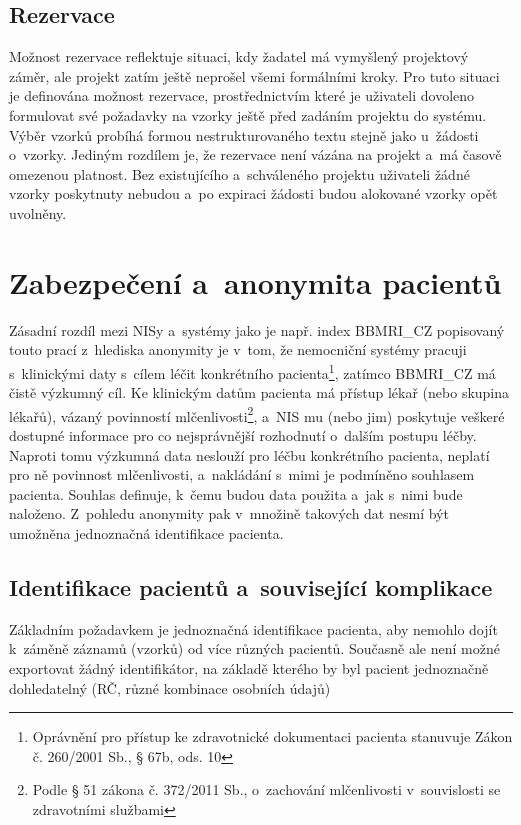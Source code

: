\documentclass[11pt, draft, oneside]{fithesis2}
\newcommand{\ProjectName}{\mbox{BBMRI\_CZ}\xspace}
\begin{document}
\subsection{Rezervace}
Možnost rezervace reflektuje situaci, kdy žadatel má vymyšlený projektový záměr, ale projekt zatím ještě neprošel všemi formálními kroky. Pro tuto situaci je definována možnost rezervace, prostřednictvím které je uživateli dovoleno formulovat své požadavky na vzorky ještě před zadáním projektu do systému. Výběr vzorků probíhá formou nestrukturovaného textu stejně jako u~žádosti o~vzorky. Jediným rozdílem je, že rezervace není vázána na projekt a~má časově omezenou platnost. Bez existujícího a~schváleného projektu uživateli žádné vzorky poskytnuty nebudou a~po expiraci žádosti budou alokované vzorky opět uvolněny.

\section{Zabezpečení a~anonymita pacientů}
Zásadní rozdíl mezi NISy a~systémy jako je např. index \ProjectName popisovaný touto prací z~hlediska anonymity je v~tom, že nemocniční systémy pracuji s~klinickými daty s~cílem léčit konkrétního pacienta\footnote{Oprávnění pro přístup ke zdravotnické dokumentaci pacienta stanuvuje Zákon č. 260/2001 Sb., § 67b, ods. 10}, zatímco \ProjectName má čistě výzkumný cíl. Ke klinickým datům pacienta má přístup lékař (nebo skupina lékařů), vázaný povinností mlčenlivosti\footnote{Podle § 51 zákona č. 372/2011 Sb., o~zachování mlčenlivosti v~souvislosti se zdravotními službami}, a~NIS mu (nebo jim) poskytuje veškeré dostupné informace pro co nejsprávnější rozhodnutí o~dalším postupu léčby. Naproti tomu výzkumná data neslouží pro léčbu konkrétního pacienta, neplatí pro ně povinnost mlčenlivosti, a~nakládání s~mimi je podmíněno souhlasem pacienta. Souhlas definuje, k~čemu budou data použita a~jak s~nimi bude naloženo. Z~pohledu anonymity pak v~množině takových dat nesmí být umožněna jednoznačná identifikace pacienta.

\subsection{Identifikace pacientů a~související komplikace}
Základním požadavkem je jednoznačná identifikace pacienta, aby nemohlo dojít k~záměně záznamů (vzorků) od více různých pacientů. Současně ale není možné exportovat žádný identifikátor, na základě kterého by byl pacient jednoznačně dohledatelný (RČ, různé kombinace osobních údajů)
\end{document}
